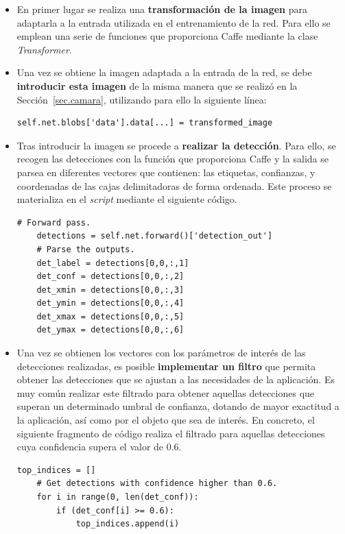 \begin{itemize}
	\item En primer lugar se realiza una \textbf{transformación de la imagen} para adaptarla a la entrada utilizada en el entrenamiento de la red. Para ello se emplean una serie de funciones que proporciona Caffe mediante la clase \textit{Transformer}.
	\item Una vez se obtiene la imagen adaptada a la entrada de la red, se debe \textbf{introducir esta imagen } de la misma manera que se realizó en la Sección~\ref{sec.camara}, utilizando para ello la siguiente línea:
	\vspace{10pt}
	\begin{lstlisting}[frame=single]
	self.net.blobs['data'].data[...] = transformed_image
	\end{lstlisting}
	\item Tras introducir la imagen se procede a \textbf{realizar la detección}. Para ello, se recogen las detecciones con la función que proporciona Caffe y la salida se parsea en diferentes vectores que contienen: las etiquetas, confianzas, y coordenadas de las cajas delimitadoras de forma ordenada. Este proceso se materializa en el \textit{script} mediante el siguiente código.
	\vspace{10pt}
	\begin{lstlisting}[frame=single]
	# Forward pass.
	detections = self.net.forward()['detection_out']
	# Parse the outputs.
	det_label = detections[0,0,:,1]
	det_conf = detections[0,0,:,2]
	det_xmin = detections[0,0,:,3]
	det_ymin = detections[0,0,:,4]
	det_xmax = detections[0,0,:,5]
	det_ymax = detections[0,0,:,6]
	\end{lstlisting}
	\item Una vez se obtienen los vectores con los parámetros de interés de las detecciones realizadas, es posible \textbf{implementar un filtro} que permita obtener las detecciones que se ajustan a las necesidades de la aplicación. Es muy común realizar este filtrado para obtener aquellas detecciones que superan un determinado umbral de confianza, dotando de mayor exactitud a la aplicación, así como por el objeto que sea de interés. En concreto, el siguiente fragmento de código realiza el filtrado para aquellas detecciones cuya confidencia supera el valor de 0.6.
	\vspace{110pt}
	\begin{lstlisting}[frame=single]
	top_indices = []
	# Get detections with confidence higher than 0.6.
	for i in range(0, len(det_conf)):
		if (det_conf[i] >= 0.6):
			top_indices.append(i)


\end{lstlisting}
\end{itemize}
